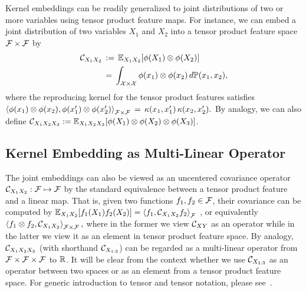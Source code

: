 \documentclass{article}
\begin{document}
Kernel embeddings can be readily generalized to joint distributions of two or more variables using tensor product feature maps. For instance, we can embed a joint distribution of two variables $X_1$ and $X_2$ into a tensor product feature space $\mathcal{F}\times \mathcal{F}$ by
\begin{align*}
    \mathcal{C}_{X_1X_2} \, &:= \, \mathbb{E}_{X_1X_2}[\phi(X_1)\otimes \phi(X_2)] \\
    \, &= \, \int_{\mathcal{X} \times \mathcal{X}} \phi(x_1) \otimes \phi(x_2) \, d\mathbb{P}(x_1, x_2),
\end{align*}
where the reproducing kernel for the tensor product features satisfies
$
	\left\langle \phi(x_1)\otimes \phi(x_2) ,\phi(x_1')\otimes \phi(x_2')  \right\rangle_{\mathcal{F}\times \mathcal{F}} \, = \,  \kappa(x_1,x_1')\,\kappa(x_2,x_2').
$
By analogy, we can also define $\mathcal{C}_{X_1X_2X_3} := \mathbb{E}_{X_1X_2X_3}[\phi(X_1)\otimes\phi(X_2)\otimes \phi(X_3)]$.

\vspace{-3mm}
\subsection{Kernel Embedding as Multi-Linear Operator}
\vspace{-3mm}

The joint embeddings can also be viewed as an uncentered covariance operator $\mathcal{C}_{X_1X_2}:\mathcal{F}\mapsto \mathcal{F}$ by the standard equivalence between a tensor product feature and a linear map.
That is, given two functions $f_1,f_2\in\mathcal{F}$, their covariance can be computed by
$
    \mathbb{E}_{X_1X_2}[f_1(X_1)f_2(X_2)]=\left\langle f_1,\mathcal{C}_{X_1X_2} f_2 \right\rangle_{\mathcal{F}}
$
, or equivalently
$
\left\langle f_1\otimes f_2,\mathcal{C}_{X_1X_2} \right\rangle_{\mathcal{F}\times\mathcal{F}},
$
where in the former we view $\mathcal{C}_{XY}$ as an operator while in the latter we view it as an element in tensor product feature space.
By analogy, $\mathcal{C}_{X_1X_2X_3}$ (with shorthand $\mathcal{C}_{X_{1:3}}$) can be regarded as a multi-linear operator from $\mathcal{F}\times\mathcal{F}\times\mathcal{F}$ to $\mathbb{R}$.
It will be clear from the context whether we use $\mathcal{C}_{X_{1:3}}$ as an operator between two spaces or as an element from a tensor product feature space. For generic introduction to tensor and tensor notation, please see~\cite{KolBad09}.
\end{document}
